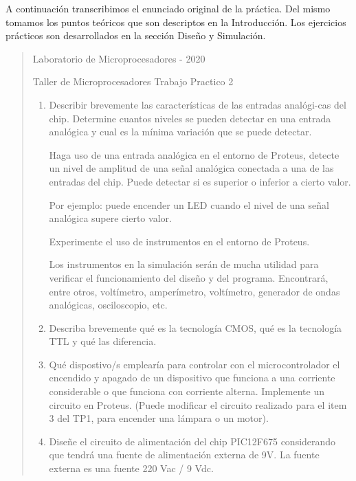 \documentclass[a4paper]{article}
\begin{document}
A continuación transcribimos el enunciado original de la práctica.
Del mismo tomamos los puntos teóricos que son descriptos en la 
Introducción. Los ejercicios prácticos son desarrollados en la sección
Diseño y Simulación.

\begin{quotation}

    \begin{center}

        Laboratorio de Microprocesadores - 2020
        
        Taller de Microprocesadores Trabajo Practico  2                

    \end{center}

    \begin{enumerate}

        \item{
            Describir brevemente las características de las entradas 
            analógi-cas del chip. Determine cuantos niveles se pueden 
            detectar en una entrada analógica y cual es la mínima 
            variación que se puede detectar.
            
            Haga uso de una entrada analógica en el entorno de Proteus,
            detecte un nivel de amplitud de una señal analógica 
            conectada a una de las entradas del chip. Puede detectar 
            si es superior o inferior a cierto valor.
            
            Por ejemplo: puede encender un LED cuando el nivel de una 
            señal analógica supere cierto valor.

            Experimente el uso de instrumentos en el entorno de Proteus.

            Los instrumentos en la simulación serán de mucha utilidad 
            para verificar el funcionamiento del diseño y del programa. 
            Encontrará, entre otros, voltímetro, amperímetro, 
            voltímetro, generador de ondas analógicas, osciloscopio, 
            etc.
        }
        \item{
            Describa brevemente qué es la tecnología CMOS, qué es la 
            tecnología TTL y qué las diferencia.
        }
        \item{
            Qué dispostivo/s emplearía para controlar con el 
            microcontrolador el encendido y apagado de un dispositivo 
            que funciona a una corriente considerable o que funciona 
            con corriente alterna. Implemente un circuito en Proteus. 
            (Puede modificar el circuito realizado para el item 3 del 
            TP1, para encender una lámpara o un motor).
        }
        \item{
            Diseñe el circuito de alimentación del chip PIC12F675 
            considerando que tendrá una fuente de alimentación externa 
            de 9V. La fuente externa es una fuente 220 Vac / 9 Vdc.
        } 
    \end{enumerate}
\end{quotation}
\end{document}
